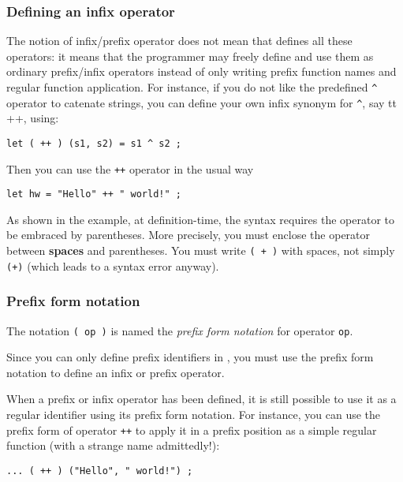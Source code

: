 \subsubsection{Defining an infix operator}

The notion of infix/prefix operator does not mean that {\focal} defines all
these operators: it means that the programmer may freely define and use them
as ordinary prefix/infix operators instead of only writing prefix function
names and regular function application. For instance, if you do not like the
{\focal} predefined \verb"^" operator to catenate strings, you can define your
own infix synonym for \verb"^", say {tt ++}, using:

{\scriptsize
\begin{lstlisting}
let ( ++ ) (s1, s2) = s1 ^ s2 ;
\end{lstlisting}
}
Then you can use the {\tt ++} operator in the usual way
{\scriptsize
\begin{lstlisting}
let hw = "Hello" ++ " world!" ;
\end{lstlisting}
}

As shown in the example, at definition-time, the syntax requires
the operator to be embraced by parentheses. More precisely, you must
enclose the operator between {\bf spaces} and parentheses.
You must write {\tt ( + )} with spaces, not simply {\tt (+)} (which leads
to a syntax error anyway).

\subsubsection{Prefix form notation}

The notation {\tt ( op )} is named the {\em prefix form notation} for
operator {\tt op}.

Since you can only define prefix identifiers in {\focal}, you must use the
prefix form notation to define an infix or prefix operator.

When a prefix or infix operator has been defined, it is still possible
to use it as a regular identifier using its prefix form notation.
For instance, you can use the prefix form of operator {\tt ++}
to apply it in a prefix position as a simple regular function (with a
strange name admittedly!):

{\scriptsize
\begin{lstlisting}
... ( ++ ) ("Hello", " world!") ;
\end{lstlisting}
}

